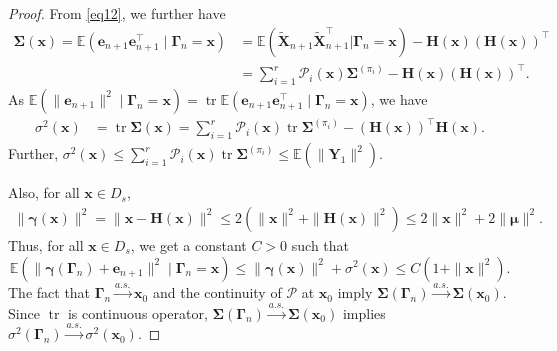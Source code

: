 \documentclass[12pt]{amsart}
\theoremstyle{plain}
\theoremstyle{remark}
\numberwithin{equation}{section}
\begin{document}
\begin{proof}
{From \eqref{eq12}, we further have
\begin{align*}
\boldsymbol{\Sigma}\left(\boldsymbol{x}\right) = \mathbb{E}\left(\boldsymbol{e}_{n+1}\boldsymbol{e}^{\top}_{n+1} \mid \boldsymbol{\Gamma}_{n} = \boldsymbol{x}\right) &= \mathbb{E}\left( \boldsymbol{\widetilde{X}}_{n+1}\boldsymbol{\widetilde{X}}^{\top}_{n+1} \Big| \boldsymbol{\Gamma}_{n} = \boldsymbol{x}\right) - 
\boldsymbol{H}\left(\boldsymbol{x}\right)\left(\boldsymbol{H}\left(\boldsymbol{x}\right)\right)^{\top}
        \\ &= \sum_{i=1}^{r}\mathcal{P}_i\left(\boldsymbol{x}\right)\boldsymbol{\Sigma}^{(\pi_i)}
        -  \boldsymbol{H}\left(\boldsymbol{x}\right)\left(\boldsymbol{H}\left(\boldsymbol{x}\right)\right)^{\top}.
\end{align*}
As $\mathbb{E}\left(\|\boldsymbol{e}_{n+1}\|^2 \mid \boldsymbol{\Gamma}_{n} = \boldsymbol{x}\right) = \operatorname{tr} \mathbb{E}\left(\boldsymbol{e}_{n+1}\boldsymbol{e}^{\top}_{n+1} \mid \boldsymbol{\Gamma}_{n} = \boldsymbol{x}\right)$,
we have 
\begin{align*}%
\sigma^2\left(\boldsymbol{x}\right) &= \operatorname{tr} \boldsymbol{\Sigma} (\boldsymbol{x}) 
 = \sum_{i=1}^{r}\mathcal{P}_i\left(\boldsymbol{x}\right)\operatorname{tr}\boldsymbol{\Sigma}^{(\pi_i)} - \left(\boldsymbol{H}\left(\boldsymbol{x}\right)\right)^{\top}\boldsymbol{H}\left(\boldsymbol{x}\right).
  \end{align*}}
Further, 
$\sigma^2\left(\boldsymbol{x}\right) \leq \sum_{i=1}^{r}\mathcal{P}_i\left(\boldsymbol{x}\right)\operatorname{tr}\boldsymbol{\Sigma}^{(\pi_i)} 
  \leq \mathbb{E}\left(\|\boldsymbol{Y}_1\|^2\right)$. %

{Also, for all $\boldsymbol{x} \in {D}_s$,
\begin{align*}
    \|\boldsymbol{\gamma}\left(\boldsymbol{x}\right)\|^2 = \|\boldsymbol{x}-\boldsymbol{H}(\boldsymbol{x})\|^2 \leq 2\left(\|\boldsymbol{x}\|^2 + \|\boldsymbol{H}(\boldsymbol{x})\|^2\right) \leq 2\|\boldsymbol{x}\|^2 + 2 \|\boldsymbol{\mu}\|^2.
\end{align*}
Thus, for all $\boldsymbol{x} \in {D}_s$, we get a constant $C > 0$ such that
\[
  \mathbb{E}\left(\|\boldsymbol{\gamma}(\boldsymbol{\Gamma}_n) + \boldsymbol{e}_{n+1}\|^2 \mid \boldsymbol{\Gamma}_n = \boldsymbol{x}\right) \leq \|\boldsymbol{\gamma}\left(\boldsymbol{x}\right)\|^2 +  \sigma^2\left(\boldsymbol{x}\right) \leq C(1+\|\boldsymbol{x}\|^2).
\]}%
{The fact that $\boldsymbol{\Gamma}_n \stackrel{a.s.}{\to} \boldsymbol{x}_0$ and the continuity of $\boldsymbol{\mathcal{P}}$ at $\boldsymbol{x}_0$ imply $\boldsymbol{\Sigma}\left(\boldsymbol{\Gamma}_n\right) \stackrel{a.s.}{\to} \boldsymbol{\Sigma}\left(\boldsymbol{x}_0\right)$. Since $\operatorname{tr}$ is continuous operator, $\boldsymbol{\Sigma}\left(\boldsymbol{\Gamma}_n\right) \stackrel{a.s.}{\to} \boldsymbol{\Sigma}\left(\boldsymbol{x}_0\right)$ implies ${\sigma^2}\left(\boldsymbol{\Gamma}_n\right) \stackrel{a.s.}{\to} {\sigma^2}\left(\boldsymbol{x}_0\right)$.}


\end{proof}
\end{document}
